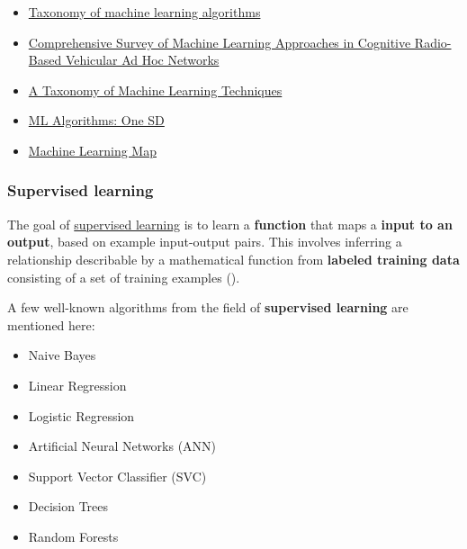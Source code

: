 \documentclass [oneside,10pt,a4paper,ngerman,BCOR10mm,headsepline,parindent,final]{scrartcl}
\providecommand{\tightlist}{%
      \setlength{\itemsep}{0pt}\setlength{\parskip}{0pt}}
\begin{document}
\begin{itemize}
\tightlist
\item
  \href{https://subscription.packtpub.com/book/big-data-/9781783558742/1/ch01lvl1sec12/taxonomy-of-machine-learning-algorithms}{Taxonomy
  of machine learning algorithms}
\item
  \href{https://www.researchgate.net/publication/340878018_Comprehensive_Survey_of_Machine_Learning_Approaches_in_Cognitive_Radio-Based_Vehicular_Ad_Hoc_Networks}{Comprehensive
  Survey of Machine Learning Approaches in Cognitive Radio-Based
  Vehicular Ad Hoc Networks}
\item
  \href{https://www.researchgate.net/publication/358089496_A_Taxonomy_of_Machine_Learning_Techniques}{A
  Taxonomy of Machine Learning Techniques}
\item
  \href{https://medium.com/@Shaier/ml-algorithms-one-sd-\%CF\%83-74bcb28fafb6}{ML
  Algorithms: One SD}
\item
  \href{https://github.com/trekhleb/homemade-machine-learning\#machine-learning-map}{Machine
  Learning Map}
\end{itemize}

    \hypertarget{supervised-learning}{%
\subsubsection{Supervised learning}\label{supervised-learning}}

The goal of
\href{https://en.wikipedia.org/wiki/Supervised_learning}{supervised
learning} is to learn a \textbf{function} that maps a \textbf{input to
an output}, based on example input-output pairs. This involves inferring
a relationship describable by a mathematical function from
\textbf{labeled training data} consisting of a set of training examples
(\cite{Wiki_Supervised_learning}).

A few well-known algorithms from the field of \textbf{supervised
learning} are mentioned here:

\begin{itemize}
\tightlist
\item
  Naive Bayes
\item
  Linear Regression
\item
  Logistic Regression
\item
  Artificial Neural Networks (ANN)
\item
  Support Vector Classifier (SVC)
\item
  Decision Trees
\item
  Random Forests
\end{itemize}
\end{document}
